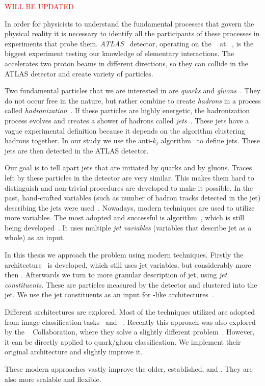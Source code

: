 
\textcolor{red}{WILL BE UPDATED}

In order for physicists to understand the fundamental processes that govern the physical reality it is necessary to identify all the participants of these processes in experiments that probe them. 
\emph{ATLAS}~\cite{ATLAS} detector, operating on the \lhc~\cite{lhc} at \cern~\cite{cern}, is the biggest experiment testing our knowledge of elementary interactions. 
The \lhc accelerates two proton beams in different directions, so they can collide in the ATLAS detector and create variety of particles.

Two fundamental particles that we are interested in are \emph{quarks} and \emph{gluons}~\cite{quarks}.
They do not occur free in the nature, but rather combine to create \emph{hadrons} in a process called \emph{hadronization}~\cite{hadronisation}.
If these particles are highly energetic, the hadronization process evolves and creates a shower of hadrons called \emph{jets}~\cite{jet}.
These jets have a vague experimental definition because it depends on the algorithm clustering hadrons together.
In our study we use the anti-$k_t$ algorithm~\cite{antikt} to define jets.
These jets are then detected in the ATLAS detector.

Our goal is to tell apart jets that are initiated by quarks and by gluons. 
Traces left by these particles in the detector are very similar.
This makes them hard to distinguish and non-trivial procedures are developed to make it possible.
In the past, hand-crafted variables (such as number of hadron tracks detected in the jet) describing the jets were used~\cite{ntrk_tag}.
Nowadays, modern \ml techniques are used to utilize more variables.
The most adopted and successful is \bdt algorithm~\cite{bdt}, which is still being developed~\cite{bdt_tag}.
It uses multiple \emph{jet variables} (variables that describe jet as a whole) as an input.

In this thesis we approach the problem using modern \dl techniques.
Firstly the \hgn architecture~\cite{highway} is developed, which still uses jet variables, but considerably more then \bdt. 
Afterwards we turn to more granular description of jet, using \emph{jet constituents}. 
These are particles measured by the detector and clustered into the jet. 
We use the jet constituents as an input for \trans-like architectures~\cite{att_is_all}.

Different architectures are explored.
Most of the techniques utilized are adopted from image classification tasks~\cite{deit3} and \nlp~\cite{bert}.
Recently this approach was also explored by the \cms~\cite{cms} Collaboration, where they solve a slightly different problem~\cite{part}.
However, it can be directly applied to quark/gluon classification.
We implement their original architecture and slightly improve it.

These modern approaches vastly improve the older, established, \bdt and \hgn.   
They are also more scalable and flexible.






